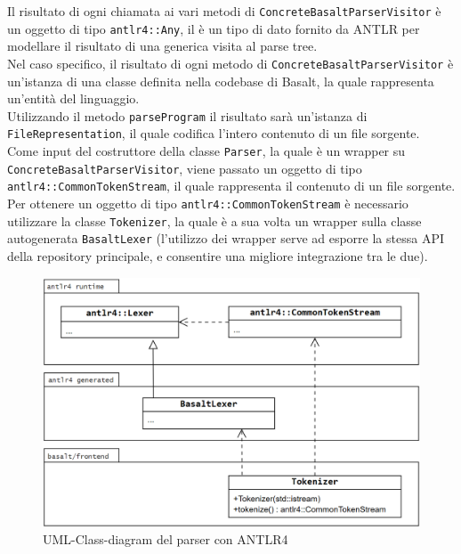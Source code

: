 Il risultato di ogni chiamata ai vari metodi di \texttt{ConcreteBasaltParserVisitor} è
un oggetto di tipo \texttt{antlr4::Any}, il è un tipo di dato fornito da ANTLR per 
modellare il risultato di una generica visita al parse tree. \\

Nel caso specifico, il risultato di ogni metodo di \texttt{ConcreteBasaltParserVisitor}
è un'istanza di una classe definita nella codebase di Basalt, la quale rappresenta
un'entità del linguaggio. \\

Utilizzando il metodo \texttt{parseProgram} il risultato sarà un'istanza di 
\texttt{FileRepresentation}, il quale codifica l'intero contenuto di un file sorgente. \\

Come input del costruttore della classe \texttt{Parser}, la quale è un wrapper 
su \texttt{ConcreteBasaltParserVisitor}, viene passato un oggetto di tipo
\texttt{antlr4::CommonTokenStream}, il quale rappresenta il contenuto di un file sorgente. \\

Per ottenere un oggetto di tipo \texttt{antlr4::CommonTokenStream} è necessario
utilizzare la classe \texttt{Tokenizer}, la quale è a sua volta un wrapper sulla classe 
autogenerata \texttt{BasaltLexer} (l'utilizzo dei wrapper serve ad esporre la stessa API
della repository principale, e consentire una migliore integrazione tra le due). \\

\begin{figure}[H]
    \centering
        \includegraphics[width=1\textwidth]{../../Assets/ANTLR-TOKENIZER-UML.png} 
    \caption{UML-Class-diagram del parser con ANTLR4}
\end{figure}